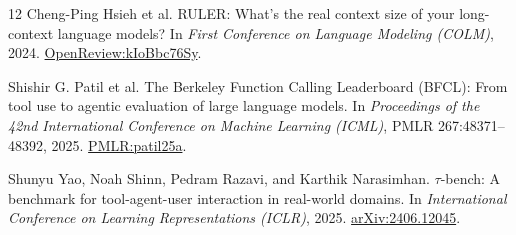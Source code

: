 \begin{thebibliography}{12}
Cheng-Ping Hsieh et al.
\newblock RULER: What's the real context size of your long-context language models?
\newblock In \emph{First Conference on Language Modeling (COLM)}, 2024.
\href{https://openreview.net/forum?id=kIoBbc76Sy}{OpenReview:kIoBbc76Sy}.

Shishir G. Patil et al.
\newblock The Berkeley Function Calling Leaderboard (BFCL): From tool use to
agentic evaluation of large language models.
\newblock In \emph{Proceedings of the 42nd International Conference on Machine
Learning (ICML)}, PMLR 267:48371--48392, 2025.
\href{https://proceedings.mlr.press/v267/patil25a.html}{PMLR:patil25a}.

Shunyu Yao, Noah Shinn, Pedram Razavi, and Karthik Narasimhan.
\newblock $\tau$-bench: A benchmark for tool-agent-user interaction in real-world
domains.
\newblock In \emph{International Conference on Learning Representations (ICLR)},
2025.  \href{https://arxiv.org/abs/2406.12045}{arXiv:2406.12045}.

\end{thebibliography}
\endgroup
